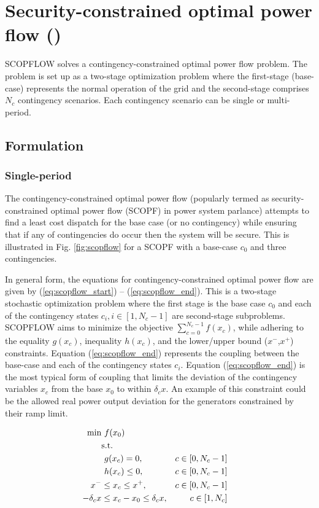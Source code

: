 \chapter{Security-constrained optimal power flow (\scopflow)}\label{chap:scopflow}
SCOPFLOW solves a contingency-constrained optimal power flow problem. The problem is set up as a two-stage optimization problem where the first-stage (base-case) represents the normal operation of the grid and the second-stage comprises $N_c$ contingency scenarios. Each contingency scenario can be single or multi-period.

\section{Formulation}

\subsection{Single-period}

The contingency-constrained optimal power flow (popularly termed as security-constrained optimal power flow (SCOPF) in power system parlance) attempts to find a least cost dispatch for the base case (or no contingency) while ensuring that if any of contingencies do occur then the system will be secure. This is illustrated in Fig. \ref{fig:scopflow} for a SCOPF with a base-case $c_0$ and three contingencies.



In general form, the equations for contingency-constrained optimal power flow are given by
(\ref{eq:scopflow_start}) -- (\ref{eq:scopflow_end}). This is a two-stage stochastic optimization problem where the first stage is the base case $c_0$ and each of the contingency states $c_i, i \in [1,N_c-1]$ are second-stage subproblems. SCOPFLOW aims to minimize the objective $\sum_{c=0}^{N_c-1}f(x_c)$, while adhering to the equality $g(x_c)$, inequality $h(x_c)$, and the lower/upper bound ($x^-$,$x^+$) constraints. Equation (\ref{eq:scopflow_end}) represents the coupling between the base-case and each of the contingency states $c_i$. Equation (\ref{eq:scopflow_end}) is the most typical form of coupling that limits the deviation of the contingency variables $x_c$ from the base $x_0$ to within $\delta_c{x}$. An example of this constraint could be the allowed real power output deviation for the generators constrained by their ramp limit.


\begin{align}
\centering
\text{min}&~f(x_0)&  \label{eq:scopflow_start}\\
&\text{s.t.}& \nonumber \\
&~g(x_c) = 0,                             &c \in \left[0,N_c-1\right]& \\
&~h(x_c) \le 0,                           &c \in \left[0,N_c-1\right]& \\
x^- & \le x_c \le x^+,                     &c\in \left[0,N_c-1\right]& \\
-\delta_c{x} & \le x_c - x_0 \le \delta_c{x},&c \in \left[1,N_c\right]&
\label{eq:scopflow_end}
\end{align}

